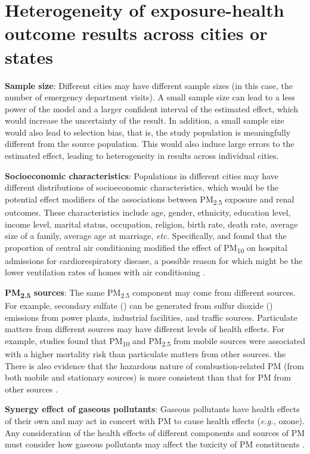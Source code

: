 \documentclass[11pt]{article}
\newcommand{\tsub}{\textsubscript}
\begin{document}
\section{Heterogeneity of exposure-health outcome results across cities or states}
\begin{enumerate*}[{[1)]}]
    \item \textbf{Sample size}: Different cities may have different sample sizes (in this case, the number of emergency department visits). A small sample size can lead to a less power of the model and a larger confident interval of the estimated effect, which would increase the uncertainty of the result. In addition, a small sample size would also lead to selection bias, that is, the study population is meaningfully different from the source population. This would also induce large errors to the estimated effect, leading to heterogeneity in results across individual cities. 
    \item \textbf{Socioeconomic characteristics}: Populations in different cities may have different distributions of socioeconomic characteristics, which would be the potential effect modifiers of the associations between PM\tsub{2.5} exposure and renal outcomes. These characteristics include age, gender, ethnicity, education level, income level, marital status, occupation, religion, birth rate, death rate, average size of a family, average age at marriage, \textit{etc.} Specifically, \citet{janssen2002air} and \citet{medina2006effect} found that the proportion of central air conditioning modified the effect of PM\tsub{10} on hospital admissions for cardiorespiratory disease, a possible reason for which might be the lower ventilation rates of homes with air conditioning \citep{suh1992personal}. 
    \item \textbf{PM\tsub{2.5} sources}: The same PM\tsub{2.5} component may come from different sources. For example, secondary sulfate () can be generated from sulfur dioxide () emissions from power plants, industrial facilities, and traffic sources. Particulate matters from different sources may have different levels of health effects. For example, studies \citep{laden2000association, zeka2005short} found that PM\tsub{10} and PM\tsub{2.5} from mobile sources were associated with a higher mortality risk than particulate matters from other sources. the There is also evidence that the hazardous nature of combustion-related PM (from both mobile and stationary sources) is more consistent than that for PM from other sources \citep{world2007health}.
    \item \textbf{Synergy effect of gaseous pollutants}: Gaseous pollutants have health effects of their own and may act in concert with PM to cause health effects (\textit{e.g.,} ozone). Any consideration of the health effects of different components and sources of PM must consider how gaseous pollutants may affect the toxicity of PM constituents \citep{adams2015particulate}.

\end{enumerate*}
\end{document}
